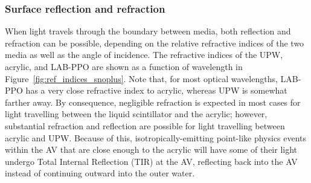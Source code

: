 \subsubsection{Surface reflection and refraction}
When light travels through the boundary between media, both reflection and refraction can be possible, depending on the relative refractive indices of the two media as well as the angle of incidence. The refractive indices of the UPW, acrylic, and LAB-PPO are shown as a function of wavelength in Figure~\ref{fig:ref_indices_snoplus}. Note that, for most optical wavelengths, LAB-PPO has a very close refractive index to acrylic, whereas UPW is somewhat farther away. By consequence, negligible refraction is expected in most cases for light travelling between the liquid scintillator and the acrylic; however, substantial refraction and reflection are possible for light travelling between acrylic and UPW. Because of this, isotropically-emitting point-like physics events within the AV that are close enough to the acrylic will have some of their light undergo Total Internal Reflection (TIR) at the AV, reflecting back into the AV instead of continuing outward into the outer water.


